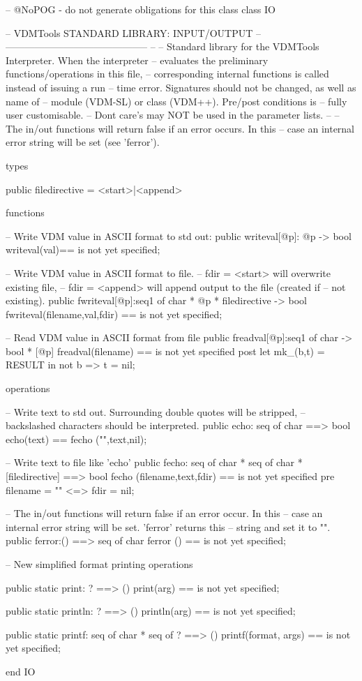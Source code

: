 \documentclass[a4paper]{article}
\begin{document}
\title{}
\author{}
\begin{vdm_al}
-- @NoPOG - do not generate obligations for this class
class IO

--  VDMTools STANDARD LIBRARY: INPUT/OUTPUT
--      --------------------------------------------
-- 
-- Standard library for the VDMTools Interpreter. When the interpreter
-- evaluates the preliminary functions/operations in this file,
-- corresponding internal functions is called instead of issuing a run
-- time error. Signatures should not be changed, as well as name of
-- module (VDM-SL) or class (VDM++). Pre/post conditions is 
-- fully user customisable. 
-- Dont care's may NOT be used in the parameter lists.
--
-- The in/out functions  will return false if an error occurs. In this
-- case an internal error string will be set (see 'ferror').

types
 
public
filedirective = <start>|<append> 

functions

-- Write VDM value in ASCII format to std out:
public
writeval[@p]: @p -> bool
writeval(val)==
  is not yet specified;

-- Write VDM value in ASCII format to file.
-- fdir = <start> will overwrite existing file,
-- fdir = <append> will append output to the file (created if
-- not existing).
public
fwriteval[@p]:seq1 of char * @p * filedirective -> bool
fwriteval(filename,val,fdir) ==
  is not yet specified;

-- Read VDM value in ASCII format from file
public
freadval[@p]:seq1 of char -> bool * [@p]
freadval(filename) ==
  is not yet specified
  post let mk_(b,t) = RESULT in not b => t = nil;

operations

-- Write text to std out. Surrounding double quotes will be stripped,
-- backslashed characters should be interpreted.
public
echo: seq of char ==> bool
echo(text) ==
  fecho ("",text,nil);

-- Write text to file like 'echo'
public
fecho: seq of char * seq of char * [filedirective] ==> bool
fecho (filename,text,fdir) ==
  is not yet specified
  pre filename = "" <=> fdir = nil;

-- The in/out functions  will return false if an error occur. In this
-- case an internal error string will be set. 'ferror' returns this
-- string and set it to "".
public
ferror:()  ==> seq of char
ferror () ==
  is not yet specified;
  
-- New simplified format printing operations

public static print: ? ==> ()
print(arg) ==
 is not yet specified;

public static println: ? ==> ()
println(arg) ==
 is not yet specified;

public static printf: seq of char * seq of ? ==> ()
printf(format, args) ==
 is not yet specified;

end IO
\end{vdm_al}
\end{document}
